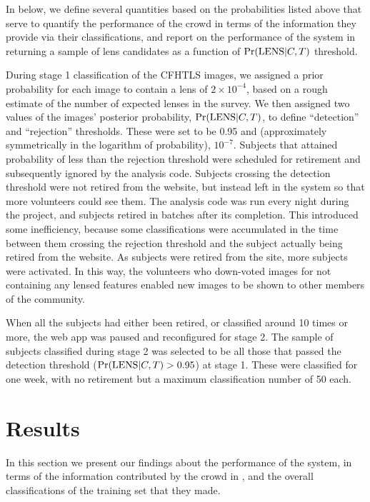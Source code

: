 \documentclass[useAMS,usenatbib,a4paper]{mn2e}
\begin{document}
In  below, we define several quantities based on the 
probabilities listed above that serve to quantify the performance of the crowd
in terms of the information they provide via their classifications, and report
on the performance of the system in returning a sample of lens candidates
as a function of ${\rm Pr}({\rm LENS}|C,T)$ threshold.


During stage 1 classification of the CFHTLS images, we assigned a prior
probability for each image to contain a lens of $2\times10^{-4}$, based on a
rough estimate of the number of expected lenses in the survey. We then
assigned two values of the images' posterior probability, ${\rm Pr}({\rm LENS}|C,T)$, to
define ``detection'' and ``rejection'' thresholds. These were set to be 0.95
and (approximately symmetrically in the logarithm of probability), $10^{-7}$.
Subjects that attained probability of less than the rejection threshold were
scheduled for retirement and subsequently ignored by the analysis code.
Subjects crossing the detection threshold were not retired from the website,
but instead left in the system so that more volunteers could see them.
The analysis code was run every night during the project, and subjects retired
in batches after its completion. This introduced some inefficiency, because
some classifications were accumulated in the time between them crossing the
rejection threshold and the subject actually being retired from the website.
As subjects were retired from the site, more subjects were activated. In this
way, the volunteers who down-voted images for not containing any lensed
features enabled new images to be shown to other members of the community.

When all the subjects had either been retired, or classified around 10 times
or more, the web app was paused and reconfigured for stage 2. The sample of
subjects classified during stage 2 was selected to be all those that passed
the detection threshold (${\rm Pr}({\rm LENS}|C,T) > 0.95$) at stage 1. These were
classified for one week, with no retirement but a maximum classification
number of 50 each. 



\section{Results}
\label{sec:results}

In this section we present our findings about the performance of the  \sw
system, in terms of the information  contributed by the crowd in
, and the overall classifications of the training set
that they made. 
\end{document}
